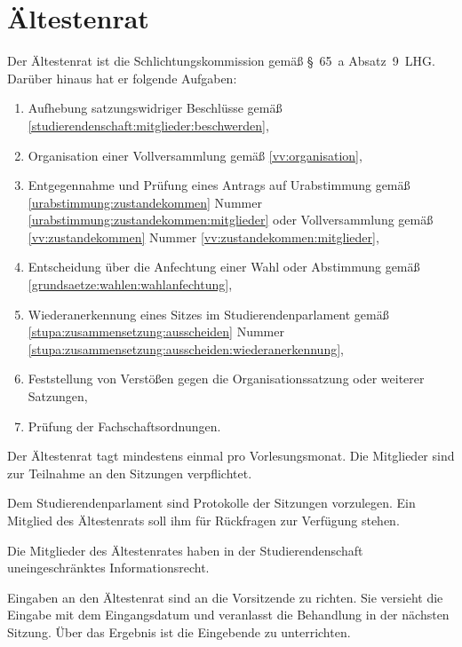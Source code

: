 %
%

\parnumberfalse \section{Ältestenrat}\label{aera} \parnumbertrue

\label{aera:aufgaben}

Der Ältestenrat ist die Schlichtungskommission gemäß §~65~a Absatz~9~LHG. Darüber hinaus hat er folgende Aufgaben: \label{aera:aufgaben:allgemein}
  \begin{enumerate}
  \item Aufhebung satzungswidriger Beschlüsse gemäß \ref{studierendenschaft:mitglieder:beschwerden},
  \item \label{aera:aufgaben:vv} Organisation einer Vollversammlung gemäß \ref{vv:organisation},
  \item \label{aera:aufgaben:ua} Entgegennahme und Prüfung eines Antrags auf Urabstimmung  gemäß \ref{urabstimmung:zustandekommen} Nummer \ref{urabstimmung:zustandekommen:mitglieder} oder Vollversammlung gemäß \ref{vv:zustandekommen} Nummer \ref{vv:zustandekommen:mitglieder},
  \item Entscheidung über die Anfechtung einer Wahl oder Abstimmung gemäß \ref{grundsaetze:wahlen:wahlanfechtung},
  \item Wiederanerkennung eines Sitzes im Studierendenparlament  gemäß \ref{stupa:zusammensetzung:ausscheiden} Nummer \ref{stupa:zusammensetzung:ausscheiden:wiederanerkennung},
  \item Feststellung von Verstößen gegen die Organisationssatzung oder weiterer Satzungen,
  \item Prüfung der Fachschaftsordnungen.
  \end{enumerate}

Der Ältestenrat tagt mindestens einmal pro Vorlesungsmonat. Die Mitglieder sind zur Teilnahme an den Sitzungen verpflichtet.

Dem Studierendenparlament sind Protokolle der Sitzungen vorzulegen. Ein Mitglied des Ältestenrats soll ihm für Rückfragen zur Verfügung stehen.

Die Mitglieder des Ältestenrates haben in der Studierendenschaft uneingeschränktes Informationsrecht.

Eingaben an den Ältestenrat sind an die Vorsitzende zu richten. Sie versieht die Eingabe mit dem Eingangsdatum und veranlasst die Behandlung in der nächsten Sitzung. Über das Ergebnis ist die Eingebende zu unterrichten.

